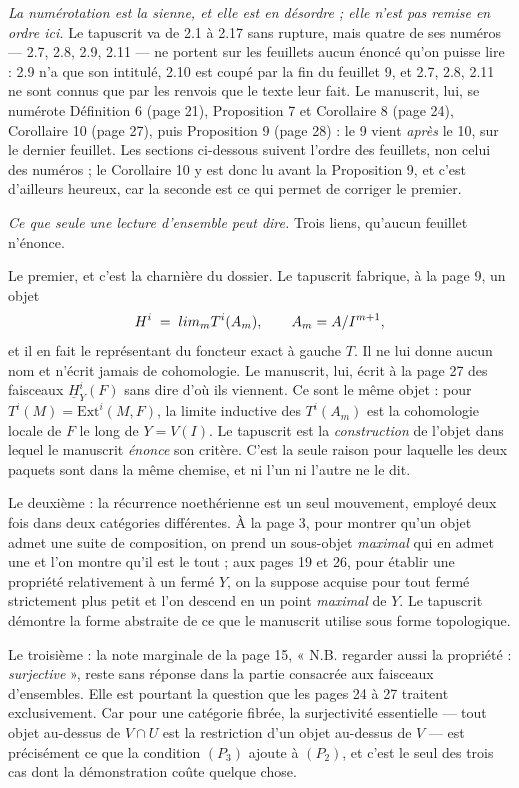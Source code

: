 \documentclass[11pt,a4paper]{article}
\begin{document}
\emph{La numérotation est la sienne, et elle est en désordre ; elle n'est pas
remise en ordre ici.} Le tapuscrit va de 2.1 à 2.17 sans rupture, mais quatre
de ses numéros — 2.7, 2.8, 2.9, 2.11 — ne portent sur les feuillets aucun
énoncé qu'on puisse lire : 2.9 n'a que son intitulé, 2.10 est coupé par la fin
du feuillet 9, et 2.7, 2.8, 2.11 ne sont connus que par les renvois que le
texte leur fait. Le manuscrit, lui, se numérote Définition 6 (page 21),
Proposition 7 et Corollaire 8 (page 24), Corollaire 10 (page 27), puis
Proposition 9 (page 28) : le 9 vient \emph{après} le 10, sur le dernier
feuillet. Les sections ci-dessous suivent l'ordre des feuillets, non celui des
numéros ; le Corollaire 10 y est donc lu avant la Proposition 9, et c'est
d'ailleurs heureux, car la seconde est ce qui permet de corriger le premier.

\emph{Ce que seule une lecture d'ensemble peut dire.} Trois liens, qu'aucun
feuillet n'énonce.

Le premier, et c'est la charnière du dossier. Le tapuscrit fabrique, à la page
9, un objet
\[
  H^{i} \;=\; \varinjlim_{m} T^{i}(A_{m}) , \qquad A_{m} = A/I^{m+1} ,
\]
et il en fait le représentant du foncteur exact à gauche $T$. Il ne lui donne
aucun nom et n'écrit jamais de cohomologie. Le manuscrit, lui, écrit à la page
27 des faisceaux $\underline{H}^{i}_{Y}(F)$ sans dire d'où ils viennent. Ce
sont le même objet : pour $T^{i}(M) = \mathrm{Ext}^{i}(M,F)$, la limite
inductive des $T^{i}(A_{m})$ est la cohomologie locale de $F$ le long de
$Y = V(I)$. Le tapuscrit est la \emph{construction} de l'objet dans lequel le
manuscrit \emph{énonce} son critère. C'est la seule raison pour laquelle les
deux paquets sont dans la même chemise, et ni l'un ni l'autre ne le dit.

Le deuxième : la récurrence noethérienne est un seul mouvement, employé deux
fois dans deux catégories différentes. À la page 3, pour montrer qu'un objet
admet une suite de composition, on prend un sous-objet \emph{maximal} qui en
admet une et l'on montre qu'il est le tout ; aux pages 19 et 26, pour établir
une propriété relativement à un fermé $Y$, on la suppose acquise pour tout
fermé strictement plus petit et l'on descend en un point \emph{maximal} de $Y$.
Le tapuscrit démontre la forme abstraite de ce que le manuscrit utilise sous
forme topologique.

Le troisième : la note marginale de la page 15, « N.B. regarder aussi la
propriété : \emph{surjective} », reste sans réponse dans la partie consacrée
aux faisceaux d'ensembles. Elle est pourtant la question que les pages 24 à 27
traitent exclusivement. Car pour une catégorie fibrée, la surjectivité
essentielle — tout objet au-dessus de $V \cap U$ est la restriction d'un objet
au-dessus de $V$ — est précisément ce que la condition $(P_3)$ ajoute à
$(P_2)$, et c'est le seul des trois cas dont la démonstration coûte quelque
chose.
\end{document}
